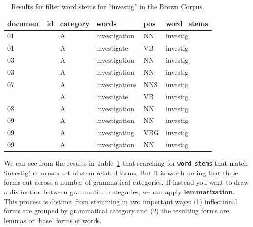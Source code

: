\documentclass[
  letterpaper,
]{scrbook}
\begin{document}
\hypertarget{tbl-recoding-stemming-brown-search}{}
\begin{table}
\caption{\label{tbl-recoding-stemming-brown-search}Results for filter word stems for ``investig'' in the Brown Corpus. }\tabularnewline

\centering
\begin{tabular}{lllll}
\toprule
document\_id & category & words & pos & word\_stems\\
\midrule
01 & A & investigation & NN & investig\\
01 & A & investigate & VB & investig\\
03 & A & investigation & NN & investig\\
03 & A & investigation & NN & investig\\
07 & A & investigations & NNS & investig\\
\addlinespace
07 & A & investigate & VB & investig\\
08 & A & investigation & NN & investig\\
09 & A & investigation & NN & investig\\
09 & A & investigating & VBG & investig\\
09 & A & investigation & NN & investig\\
\bottomrule
\end{tabular}
\end{table}

We can see from the results in
Table~\ref{tbl-recoding-stemming-brown-search} that searching for
\texttt{word\_stems} that match `investig' returns a set of stem-related
forms. But it is worth noting that these forms cut across a number of
grammatical categories. If instead you want to draw a distinction
between grammatical categories, we can apply \textbf{lemmatization.}
This process is distinct from stemming in two important ways: (1)
inflectional forms are grouped by grammatical category and (2) the
resulting forms are lemmas or `base' forms of words.
\end{document}
